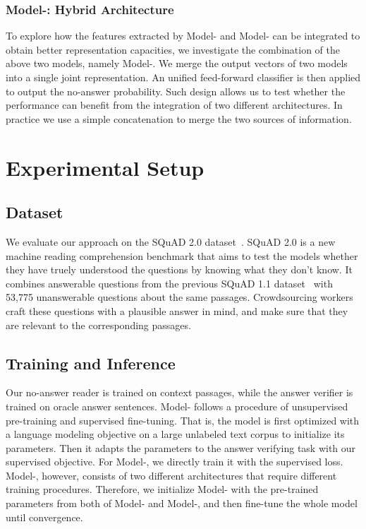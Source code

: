 \documentclass[letterpaper]{article} \usepackage{aaai19}  \usepackage{times}  \usepackage{helvet}  \usepackage{courier}  \usepackage{url}  \usepackage{graphicx}  \usepackage{pbox}
\begin{document}
\subsubsection{Model-\uppercase\expandafter{}: Hybrid Architecture}
To explore how the features extracted by Model-\uppercase\expandafter{} and Model-\uppercase\expandafter{} can be integrated to obtain better representation capacities, we investigate the combination of the above two models, namely Model-\uppercase\expandafter{}. 
We merge the output vectors of two models into a single joint representation. 
An unified feed-forward classifier is then applied to output the no-answer probability.
Such design allows us to test whether the performance can benefit from the integration of two different architectures. 
In practice we use a simple concatenation to merge the two sources of information.

 \section{Experimental Setup}

\subsection{Dataset}
We evaluate our approach on the SQuAD 2.0 dataset~\cite{Rajpurkar18}. 
SQuAD 2.0 is a new machine reading comprehension benchmark that aims to test the models whether they have truely understood the questions by knowing what they don't know. 
It combines answerable questions from the previous SQuAD 1.1 dataset~\cite{Rajpurkar16} with 53,775 unanswerable questions about the same passages.
Crowdsourcing workers craft these questions with a plausible answer in mind, and make sure that they are relevant to the corresponding passages.


\subsection{Training and Inference}
Our no-answer reader is trained on context passages, while the answer verifier is trained on oracle answer sentences.
Model-\uppercase\expandafter{} follows a procedure of unsupervised pre-training and supervised fine-tuning. 
That is, the model is first optimized with a language modeling objective on a large unlabeled text corpus to initialize its parameters. 
Then it adapts the parameters to the answer verifying task with our supervised objective.
For Model-\uppercase\expandafter{}, we directly train it with the supervised loss.
Model-\uppercase\expandafter{}, however, consists of two different architectures that require different training procedures. Therefore, we initialize Model-\uppercase\expandafter{} with the pre-trained parameters from both of Model-\uppercase\expandafter{} and Model-\uppercase\expandafter{}, and then fine-tune the whole model until convergence.
\end{document}
